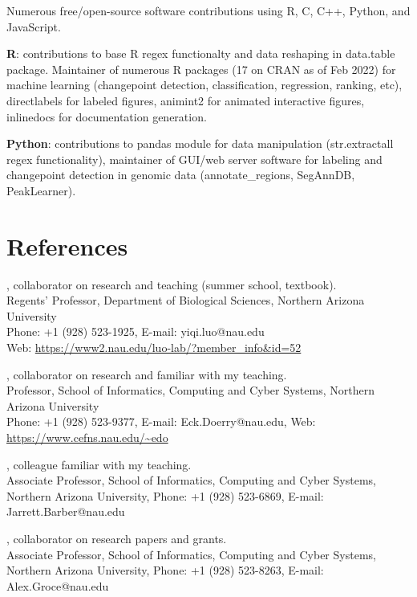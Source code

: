 \documentclass[margin,line]{res}
\begin{document}
\begin{resume}
Numerous free/open-source software contributions using R, C, C++,
Python, and JavaScript.

{\bf R}: contributions to base R regex functionalty and data reshaping
in data.table package. Maintainer of numerous R packages (17 on CRAN
as of Feb 2022) for machine learning (changepoint detection,
classification, regression, ranking, etc), directlabels for labeled
figures, animint2 for animated interactive figures, inlinedocs for
documentation generation.

{\bf Python}: contributions to pandas module for data manipulation
(str.extractall regex functionality), maintainer of GUI/web server
software for labeling and changepoint detection in genomic data
(annotate\_regions, SegAnnDB, PeakLearner).

\section{\sc References}

, collaborator on research and teaching (summer school, textbook).\\
Regents' Professor, Department of Biological Sciences, Northern Arizona University\\
Phone: +1 (928) 523-1925, E-mail: yiqi.luo@nau.edu\\
Web: \url{https://www2.nau.edu/luo-lab/?member_info&id=52}

, collaborator on research and familiar with my teaching.\\
Professor, School of Informatics, Computing and Cyber Systems, Northern Arizona University\\
Phone: +1 (928) 523-9377, E-mail: Eck.Doerry@nau.edu, Web: \url{https://www.cefns.nau.edu/~edo}

, colleague familiar with my teaching.\\
Associate Professor, School of Informatics, Computing and Cyber Systems,\\
Northern Arizona University, 
Phone: +1 (928) 523-6869, E-mail: Jarrett.Barber@nau.edu

, collaborator on research papers and grants.\\
Associate Professor, School of Informatics, Computing and Cyber Systems,\\
Northern Arizona University, 
Phone: +1 (928) 523-8263, E-mail: Alex.Groce@nau.edu


\end{resume}
\end{document}
